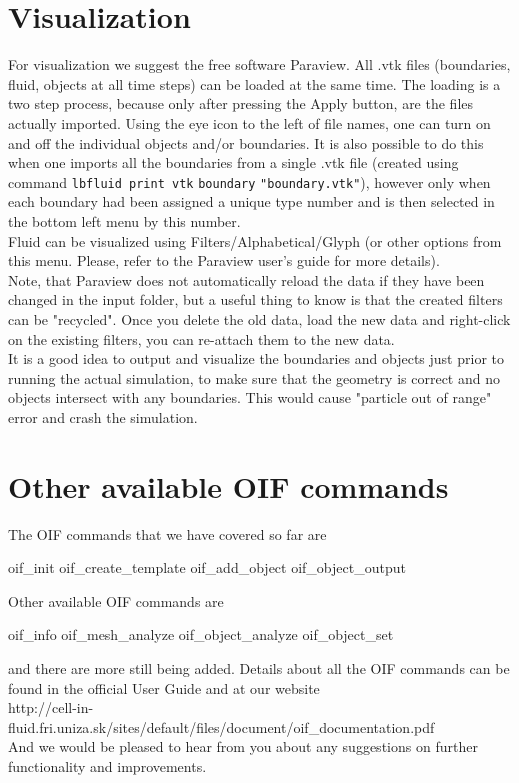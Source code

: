 \documentclass[
a4paper,                        %
11pt,                           %
twoside,                        %
footsepline,                    %
headsepline,                    %
headexclude,                    %
footexclude,                    %
pagesize,                       %
]{scrartcl}
\begin{document}
\section{Visualization}
For visualization we suggest the free software Paraview. All .vtk files (boundaries, fluid, objects at all time steps) can be loaded at the same time. The loading is a two step process, because only after pressing the Apply button, are the files actually imported. Using the eye icon to the left of file names, one can turn on and off the individual objects and/or boundaries. It is also possible to do this when one imports all the boundaries from a single .vtk file (created using command \verb|lbfluid print vtk| \verb|boundary| \verb|"boundary.vtk"|), however only when each boundary had been assigned a unique type number and is then selected in the bottom left menu by this number.\\ 

Fluid can be visualized using Filters/Alphabetical/Glyph (or other options from this menu. Please, refer to the Paraview user's guide for more details).\\

Note, that Paraview does not automatically reload the data if they have been changed in the input folder, but a useful thing to know is that the created filters can be "recycled". Once you delete the old data, load the new data and right-click on the existing filters, you can re-attach them to the new data.\\
  
It is a good idea to output and visualize the boundaries and objects just prior to running the actual simulation, to make sure that the geometry is correct and no objects intersect with any boundaries. This would cause "particle out of range" error and crash the simulation.\\ 

\section{Other available OIF commands}

The OIF commands that we have covered so far are\\
 \begin{tclcode}
oif_init
oif_create_template
oif_add_object
oif_object_output
 \end{tclcode}
 \vspace{0 mm}
 
Other available OIF commands are\\
\begin{tclcode}
oif_info
oif_mesh_analyze
oif_object_analyze
oif_object_set
\end{tclcode}
 \vspace{0 mm}

and there are more still being added. Details about all the OIF commands can be found in the official \es User Guide and at our website\\ http://cell-in-fluid.fri.uniza.sk/sites/default/files/document/oif\_documentation.pdf\\ 
And we would be pleased to hear from you about any suggestions on further functionality and improvements.
\end{document}
